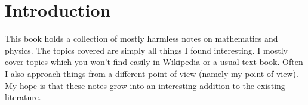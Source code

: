 \documentclass[12pt,a4paper,twoside]{book}
\begin{document}
\tableofcontents
\chapter{Introduction}
This book holds a collection of mostly harmless notes on mathematics and physics. The topics covered are simply all things I found interesting. I mostly cover topics which 
you won't find easily in Wikipedia or a usual text book. Often I also approach things from a different point of view (namely my point of view). My hope is that these notes grow into an interesting addition to the existing literature. 



\appendix
%




\end{document}
